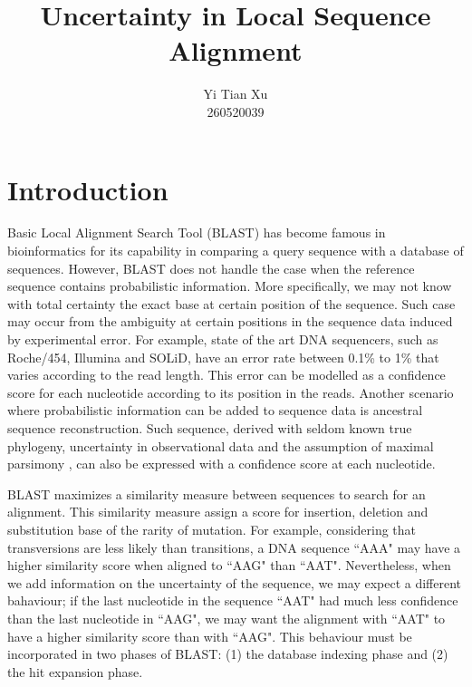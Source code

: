 \documentclass{article}
\begin{document}
\title{Uncertainty in Local Sequence Alignment}
\author{Yi Tian Xu\\260520039}

\maketitle



\section{Introduction}

Basic Local Alignment Search Tool (BLAST) has become famous in bioinformatics for its capability in comparing a query sequence with a database of sequences. However, BLAST does not handle the case when the reference sequence contains probabilistic information. More specifically, we may not know with total certainty the exact base at certain position of the sequence. Such case may occur from the ambiguity at certain positions in the sequence data induced by experimental error. For example, state of the art DNA sequencers, such as Roche/454, Illumina and SOLiD, have an error rate between 0.1\% to 1\% that varies according to the read length. \cite{sequencers} This error can be modelled as a confidence score for each nucleotide according to its position in the reads. Another scenario where probabilistic information can be added to sequence data is ancestral sequence reconstruction. Such sequence, derived with seldom known true phylogeny, uncertainty in observational data and the assumption of maximal parsimony \cite{parsimony}, can also be expressed with a confidence score at each nucleotide. 

BLAST maximizes a similarity measure between sequences to search for an alignment. This similarity measure assign a score for insertion, deletion and substitution base of the rarity of mutation. \cite{blast} For example, considering that transversions are less likely than transitions, a DNA sequence ``AAA" may have a higher similarity score when aligned to ``AAG" than ``AAT". Nevertheless, when we add information on the uncertainty of the sequence, we may expect a different bahaviour; if the last nucleotide in the sequence ``AAT" had much less confidence than the last nucleotide in ``AAG", we may want the alignment with ``AAT" to have a higher similarity score than with ``AAG". This behaviour must be incorporated in two phases of BLAST: (1) the database indexing phase and (2) the hit expansion phase.  
\end{document}
